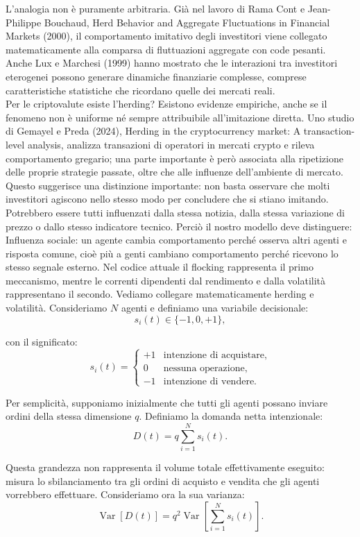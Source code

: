 L'analogia non è puramente arbitraria. Già nel lavoro di Rama Cont e Jean-Philippe Bouchaud, Herd Behavior and Aggregate Fluctuations in Financial 
Markets (2000), il comportamento imitativo degli investitori viene collegato matematicamente alla comparsa di fluttuazioni aggregate con code pesanti.
Anche Lux e Marchesi (1999) hanno mostrato che le interazioni tra investitori eterogenei possono generare dinamiche finanziarie complesse, comprese 
caratteristiche statistiche che ricordano quelle dei mercati reali.\\
Per le criptovalute esiste l'herding? Esistono evidenze empiriche, anche se il fenomeno non è uniforme né sempre attribuibile all'imitazione diretta.
Uno studio di Gemayel e Preda (2024), Herding in the cryptocurrency market: A transaction-level analysis, analizza transazioni di operatori in mercati 
crypto e rileva comportamento gregario; una parte importante è però associata alla ripetizione delle proprie strategie passate, oltre che alle influenze 
dell'ambiente di mercato.
Questo suggerisce una distinzione importante: non basta osservare che molti investitori agiscono nello stesso modo per concludere che si stiano imitando.
Potrebbero essere tutti influenzati dalla stessa notizia, dalla stessa variazione di prezzo o dallo stesso indicatore tecnico.
Perciò il nostro modello deve distinguere: Influenza sociale: un agente cambia comportamento perché osserva altri agenti e risposta comune, cioè più a
genti cambiano comportamento perché ricevono lo stesso segnale esterno.
Nel codice attuale il flocking rappresenta il primo meccanismo, mentre le correnti dipendenti dal rendimento e dalla volatilità rappresentano il secondo.
Vediamo collegare matematicamente herding e volatilità. Consideriamo \(N\) agenti e definiamo una variabile decisionale:
\[
s_i(t)\in\{-1,0,+1\},
\]

con il significato:
\[
s_i(t)=
\begin{cases}
+1 & \text{intenzione di acquistare},\\
0 & \text{nessuna operazione},\\
-1 & \text{intenzione di vendere}.
\end{cases}
\]

Per semplicità, supponiamo inizialmente che tutti gli agenti possano inviare ordini della stessa dimensione \(q\).
Definiamo la domanda netta intenzionale:
\[
D(t)=q\sum_{i=1}^{N}s_i(t).
\]

Questa grandezza non rappresenta il volume totale effettivamente eseguito: misura lo sbilanciamento tra gli ordini di acquisto e vendita che gli agenti 
vorrebbero effettuare. Consideriamo ora la sua varianza:
\[
\operatorname{Var}[D(t)]
=
q^2\operatorname{Var}\left[\sum_{i=1}^{N}s_i(t)\right].
\]

